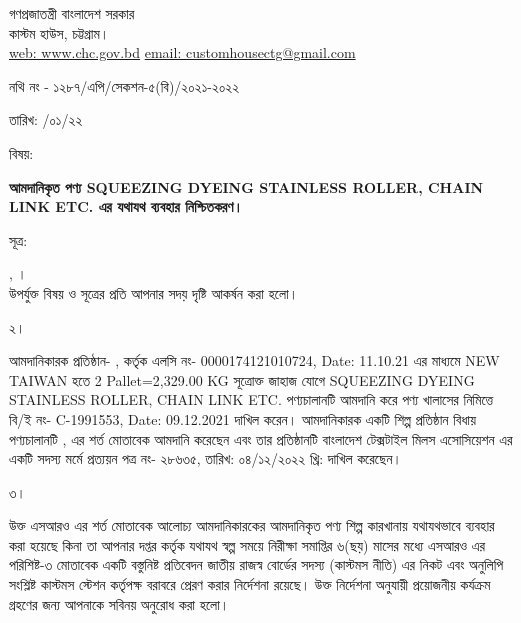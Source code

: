 \documentclass[12pt]{article}
\newcommand{\fileno}{নথি নং - ১২৮৭/এপি/সেকশন-৫(বি)/২০২১-২০২২}
\newcommand{\fdt}{\hspace*{3em} তারিখ: \hspace{2.4em} /০১/২২}
\newcommand{\good}{SQUEEZING DYEING STAINLESS ROLLER, CHAIN LINK ETC.}
\newcommand{\pkg}{2 Pallet=2,329.00 KG}
\newcommand{\co}{NEW TAIWAN}
\newcommand{\beno}{C-1991553}
\newcommand{\bedt}{09.12.2021}
\newcommand{\lcno}{0000174121010724}
\newcommand{\lcdt}{11.10.21}
\newcommand{\impn}{\jdwl}
\newcommand{\impadd}{\jdwla}
\newcommand{\btmaltno}{প্রত্যয়ন পত্র নং- ২৮৬৩৫}
\newcommand{\btmaltnodt}{তারিখ:  ০৪/১২/২০২২ খ্রি:}
\begin{document}
\newpage
\begin{center}
\vspace*{6MM}
গণপ্রজাতন্ত্রী বাংলাদেশ সরকার
\\
\footnotesize{কাস্টম হাউস, চট্টগ্রাম।}
\\
\href{}{web: www.chc.gov.bd}\hspace{1em}
\href{}{email: customhousectg@gmail.com}
\end{center}
\begin{minipage}[t]{.70\linewidth}
{\fileno}
\end{minipage}
\begin{minipage}[t]{.30\linewidth}
{\fdt}
\\
\end{minipage}
\begin{minipage}[t]{.07\linewidth}
বিষয়:
\end{minipage}
\begin{minipage}[t]{.93\linewidth}
\textbf{আমদানিকৃত পণ্য {\good} এর যথাযথ ব্যবহার নিশ্চিতকরণ।}
\end{minipage}
\begin{minipage}[t]{.07\linewidth}
সূত্র:
\end{minipage}
\begin{minipage}[t]{.93\linewidth}
{\srootz}, {\srootzd}।
\\
উপর্যুক্ত বিষয় ও সূত্রের প্রতি আপনার সদয় দৃষ্টি
আকর্ষন করা হলো।
\\
\end{minipage}
\begin{minipage}[t]{.07\linewidth}
২।
\end{minipage}
\begin{minipage}[t]{.93\linewidth}
আমদানিকারক প্রতিষ্ঠান- {\impn}, {\impadd}
কর্তৃক এলসি নং- {\lcno}, Date: {\lcdt}
এর মাধ্যমে {\co} হতে
{\pkg} সূত্রোক্ত জাহাজ যোগে {\good}
পণ্যচালানটি আমদানি করে পণ্য
খালাসের নিমিত্তে বি/ই নং- {\beno}, Date: {\bedt}
দাখিল করেন। আমদানিকারক একটি
শিল্প প্রতিষ্ঠান বিধায় পণ্যচালানটি
{\srootz}, {\srootzd}
এর শর্ত মোতাবেক আমদানি করেছেন এবং
তার প্রতিষ্ঠানটি বাংলাদেশ টেক্সটাইল মিলস
এসোসিয়েশন এর একটি সদস্য মর্মে
{\btmaltno}, {\btmaltnodt}
দাখিল করেছেন।
\\
\end{minipage}
\begin{minipage}[t]{.07\linewidth}
৩।
\end{minipage}
\begin{minipage}[t]{.93\linewidth}
উক্ত এসআরও এর শর্ত মোতাবেক
আলোচ্য আমদানিকারকের আমদানিকৃত পণ্য
শিল্প কারখানায় যথাযথভাবে ব্যবহার করা হয়েছে
কিনা তা আপনার দপ্তর কর্তৃক
যথাযথ স্বল্প সময়ে
নিরীক্ষা সমাপ্তির ৬(ছয়) মাসের মধ্যে এসআরও
এর পরিশিষ্ট-৩ মোতাবেক একটি বস্তুনিষ্ট
প্রতিবেদন জাতীয় রাজস্ব বোর্ডের সদস্য
(কাস্টমস নীতি) এর নিকট এবং অনুলিপি সংশ্লিষ্ট
কাস্টমস স্টেশন কর্তৃপক্ষ বরাবরে প্রেরণ করার
নির্দেশনা রয়েছে। উক্ত নির্দেশনা
অনুযায়ী প্রয়োজনীয় কর্যক্রম গ্রহণের জন্য
আপনাকে সবিনয় অনুরোধ করা হলো।
\\
\\
\\
\end{minipage}
\end{document}
